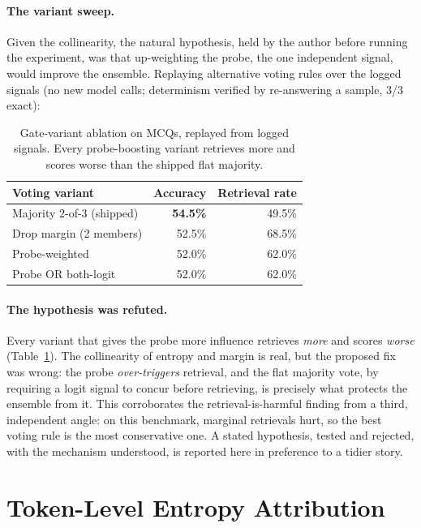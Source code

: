\paragraph{The variant sweep.} Given the collinearity, the natural hypothesis,
held by the author before running the experiment, was that
up-weighting the probe, the one independent signal, would improve the
ensemble. Replaying alternative voting rules over the logged signals (no new
model calls; determinism verified by re-answering a sample, 3/3 exact):

\begin{table}[ht]
  \centering
  \caption{Gate-variant ablation on \nQuestions{} MCQs, replayed from logged
    signals. Every probe-boosting variant retrieves more and scores worse
    than the shipped flat majority.}
  \label{tab:gate-variants}
  \begin{tabular}{lrr}
    \toprule
    \textbf{Voting variant} & \textbf{Accuracy} & \textbf{Retrieval rate} \\
    \midrule
    Majority 2-of-3 (shipped) & \textbf{54.5\%} & 49.5\% \\
    Drop margin (2 members)   & 52.5\% & 68.5\% \\
    Probe-weighted            & 52.0\% & 62.0\% \\
    Probe OR both-logit       & 52.0\% & 62.0\% \\
    \bottomrule
  \end{tabular}
\end{table}

\paragraph{The hypothesis was refuted.} Every variant that gives the probe
more influence retrieves \emph{more} and scores \emph{worse}
(Table~\ref{tab:gate-variants}). The collinearity of entropy and margin is
real, but the proposed fix was wrong: the probe \emph{over-triggers}
retrieval, and the flat majority vote, by requiring a logit signal to concur
before retrieving, is precisely what protects the ensemble from it. This
corroborates the retrieval-is-harmful finding from a third, independent
angle: on this benchmark, marginal retrievals hurt, so the best voting rule
is the most conservative one. A stated hypothesis, tested and rejected, with
the mechanism understood, is reported here in preference to a tidier story.

\section{Token-Level Entropy Attribution}
\label{sec:eval-attribution}

